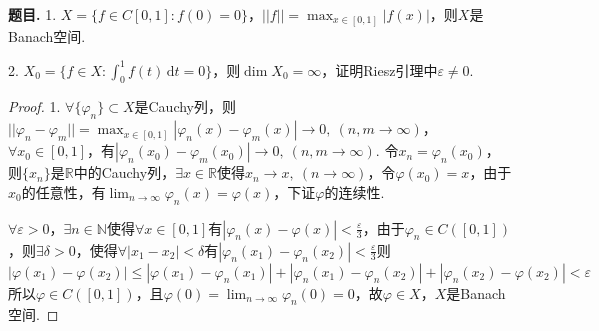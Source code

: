 \documentclass[12pt, a4paper, oneside]{ctexart}
\newcounter{problem}  %
\newenvironment{problem}{\stepcounter{problem}\par\noindent\textbf{题目\arabic{problem}. }}{\smallskip\par}
\let\leq=\leqslant %
\def\R{\mathbb{R}}          %
\def\N{\mathbb{N}}          %
\def\d{\mathrm{d}}          %
\begin{document}
\begin{problem}
    1. $X = \{f\in C[0,1]:f(0)=0\}$，$||f||=\max_{x\in[0,1]}|f(x)|$，则$X$是Banach空间.

    2. $X_0=\{f\in X: \int_0^1f(t)\,\d t=0\}$，则$\dim X_0=\infty$，证明Riesz引理中$\varepsilon\neq 0$.
\end{problem}
\begin{proof}
    1. $\forall\{\varphi_n\}\subset X$是Cauchy列，则$||\varphi_n-\varphi_m||=\max_{x\in[0,1]}|\varphi_n(x)-\varphi_m(x)|\to0,\ (n,m\to\infty)$，$\forall x_0\in [0,1]$，有$|\varphi_n(x_0) - \varphi_m(x_0)|\to 0,\ (n,m\to\infty)$. 令$x_n = \varphi_n(x_0)$，则$\{x_n\}$是$\R$中的Cauchy列，$\exists x\in\R$使得$x_n\to x,\ (n\to\infty)$，令$\varphi(x_0) = x$，由于$x_0$的任意性，有$\lim_{n\to\infty}\varphi_n(x) = \varphi(x)$，下证$\varphi$的连续性.

    $\forall \varepsilon > 0$，$\exists n\in\N$使得$\forall x\in [0,1]$有$|\varphi_n(x)-\varphi(x)| < \frac{\varepsilon}{3}$，由于$\varphi_n\in C([0,1])$，则$\exists \delta >0$，使得$\forall |x_1-x_2| < \delta$有$|\varphi_n(x_1)-\varphi_n(x_2)| < \frac{\varepsilon}{3}$则
    \begin{equation*}
        |\varphi(x_1)-\varphi(x_2)|\leq |\varphi(x_1)-\varphi_n(x_1)|+|\varphi_n(x_1)-\varphi_n(x_2)|+|\varphi_n(x_2)-\varphi(x_2)| < \varepsilon
    \end{equation*}
    所以$\varphi\in C([0,1])$，且$\varphi(0) = \lim_{n\to\infty}\varphi_n(0) = 0$，故$\varphi \in X$，$X$是Banach空间.
\end{proof}
\iffalse
\centerline{
    \texttt{[image: figure.png]}
}
\renewcommand\arraystretch{0.8} %
\begin{table}[!htbp] %
    \centering %
    \begin{tabular}{p{1cm}<{\centering}p{1cm}<{\centering}p{3cm}<{\centering}p{5cm}<{\centering}} %
        \toprule
        $x_i$ & $f[x_1]$ & $f[x_i,x_{i+1}]$ & $f[x_i,x_{i+1},x_{i+2}]$ \\
        \midrule
        $x_0$ & $f(x_0)$ &                  &                          \\
        $x_0$ & $f(x_0)$ & $f'(x_0)$        &                          \\
        $x_0$ & $f(x_1)$ & $\frac{f(x_1)-f(x_0)}{x_1-x_0}$ & $\frac{f(x_1)-f(x_0)}{(x_1-x_0)^2}-\frac{f'(x_0)}{x_1-x_0}$\\
        \bottomrule
    \end{tabular}
\end{table}

\def\Log{\text{Log}} %
$\Log$ %
\fi
\end{document}
